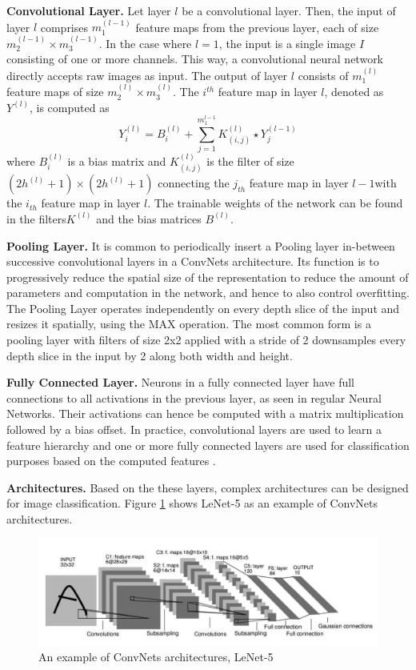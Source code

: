 \documentclass{article} %
\begin{document}
\textbf{Convolutional Layer.} Let layer $l$ be a convolutional layer. Then, the input of layer $l$ comprises $m_1^{ (l-1) }$ feature maps from the previous layer, each of size $m_2^{(l-1)} \times m_3^{(l-1)}$. In the case where $l = 1$, the input is a single image $I$ consisting of one or more channels. This way, a convolutional neural network directly accepts raw images as input. The output of layer $l$ consists of $m_1^{(l)}$ feature maps of size $m_2^{(l)} \times m_3^{(l)}$. The $i^{th}$ feature map in layer $l$, denoted as $Y^(l)$, is computed as
\begin{equation}
Y_i^{(l)}=B_i^{(l)}+\sum^{m_{1}^{l-1}}_{j=1} K_{(i,j)}^{(l)} \star Y_{j}^{(l-1)}
\end{equation}
where $B_i^{(l)}$ is a bias matrix and $K_{(i,j)}^{(l)}$ is the filter of size $(2h^{(l)} + 1)\times (2h^{(l)} + 1)$ connecting the $j_{th}$ feature map in layer $l-1$with the $i_{th}$ feature map in layer $l$. The trainable weights of the network can be found in the filters$ K^{(l)}$ and the bias matrices $B^{(l)}$. 

\textbf{Pooling Layer.} It is common to periodically insert a Pooling layer in-between successive convolutional layers in a ConvNets architecture. Its function is to progressively reduce the spatial size of the representation to reduce the amount of parameters and computation in the network, and hence to also control overfitting. The Pooling Layer operates independently on every depth slice of the input and resizes it spatially, using the MAX operation. The most common form is a pooling layer with filters of size 2x2 applied with a stride of 2 downsamples every depth slice in the input by 2 along both width and height. 

\textbf{Fully Connected Layer.} Neurons in a fully connected layer have full connections to all activations in the previous layer, as seen in regular Neural Networks. Their activations can hence be computed with a matrix multiplication followed by a bias offset. In practice, convolutional layers are used to learn a feature hierarchy and one or more fully connected layers are used for classification purposes based on the computed features \cite{LBD89, LKF10}. 

\textbf{Architectures.} Based on the these layers, complex architectures can be designed for image classification. Figure \ref{fig:cnn_example} shows LeNet-5 as an example of ConvNets architectures.
\begin{figure}[h]
	\centering
	\includegraphics[width=\textwidth=0.95\widthtext]{figs/cnn_example.png}
	\caption{An example of ConvNets architectures, LeNet-5}
	\label{fig:cnn_example}
\end{figure}
\end{document}
